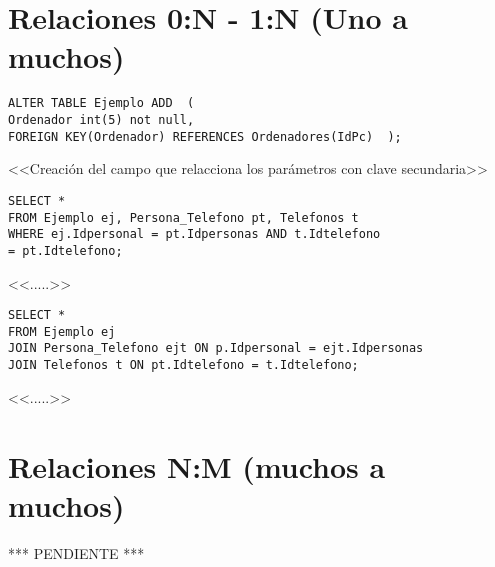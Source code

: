 \documentclass[a4paper, 11pt, titlepage]{article}
\begin{document}
\newpage

\section*{Relaciones 0:N - 1:N (Uno a muchos)}

\begin{verbatim}
ALTER TABLE Ejemplo ADD  (
Ordenador int(5) not null,
FOREIGN KEY(Ordenador) REFERENCES Ordenadores(IdPc)  );
\end{verbatim}
<<Creación del campo que relacciona los parámetros con clave secundaria>>
\begin{verbatim}
SELECT * 
FROM Ejemplo ej, Persona_Telefono pt, Telefonos t 
WHERE ej.Idpersonal = pt.Idpersonas AND t.Idtelefono 
= pt.Idtelefono;  
\end{verbatim}
<<.....>>
\begin{verbatim}
SELECT * 
FROM Ejemplo ej 
JOIN Persona_Telefono ejt ON p.Idpersonal = ejt.Idpersonas 
JOIN Telefonos t ON pt.Idtelefono = t.Idtelefono;  
\end{verbatim}
<<.....>>


\section*{Relaciones N:M (muchos a muchos)}

*** PENDIENTE ***
\end{document}
